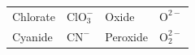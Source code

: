 {{\begin{center}
\begin{xtabular}[t]{|l|l|l|l|}
    
        Chlorate &
    
    
        \begin{math}\mathrm{ClO}_{3}^{-}\end{math} &
    
    
        Oxide &
    
    
        \begin{math}{\mathrm{O}}^{2-}\end{math}%
     \tabularnewline{}
    
    
        Cyanide &
    
    
        \begin{math}{\mathrm{CN}}^{-}\end{math} &
    
    
        Peroxide &
    
    
        \begin{math}\mathrm{O}_{2}^{2-}\end{math}%
     \tabularnewline{}
    

\end{xtabular}
\end{center}}}
